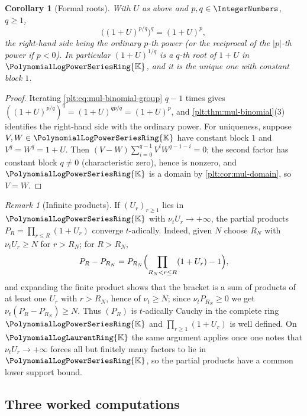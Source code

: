 \documentclass[11pt,oneside]{article}
\theoremstyle{plain}
\newtheorem{corollary}[theorem]{Corollary}
\theoremstyle{definition}
\theoremstyle{remark}
\newtheorem{remark}[theorem]{Remark}
\newcommand{\K}{\mathbb{K}}
\newcommand{\PLpow}{\PolynomialLogPowerSeriesRing{\K}}   %
\newcommand{\PLlau}{\PolynomialLogLaurentRing{\K}}       %
\newcommand{\ordt}{\nu_{t}}                              %
\begin{document}
\begin{corollary}[Formal roots]
\label{plt:cor:mul-roots}
With $U$ as above and $p,q\in\IntegerNumbers$, $q\ge1$,
\[
 \bigl((1+U)^{p/q}\bigr)^{q}=(1+U)^{p},
\]
the right-hand side being the ordinary $p$-th power (or the reciprocal of the
$|p|$-th power if $p<0$).  In particular $(1+U)^{1/q}$ is a $q$-th root of
$1+U$ in $\PLpow$, and it is the unique one with constant block $1$.
\end{corollary}

\begin{proof}
Iterating \eqref{plt:eq:mul-binomial-group} $q-1$ times gives
$((1+U)^{p/q})^q=(1+U)^{qp/q}=(1+U)^p$, and
\cref{plt:thm:mul-binomial}(3) identifies the right-hand side with the
ordinary power.  For uniqueness, suppose $V,W\in\PLpow$ have constant block
$1$ and $V^q=W^q=1+U$.  Then $(V-W)\sum_{i=0}^{q-1}V^iW^{q-1-i}=0$; the
second factor has constant block $q\ne0$ (characteristic zero), hence is
nonzero, and $\PLpow$ is a domain by \cref{plt:cor:mul-domain}, so $V=W$.
\end{proof}

\begin{remark}[Infinite products]
\label{plt:rmk:mul-infinite-products}
If $(U_r)_{r\ge1}$ lies in $\PLpow$ with $\ordt U_r\to+\infty$, the partial
products $P_R=\prod_{r\le R}(1+U_r)$ converge $t$-adically.  Indeed, given
$N$ choose $R_N$ with $\ordt U_r\ge N$ for $r>R_N$; for $R>R_N$,
\[
 P_R-P_{R_N}=P_{R_N}\Bigl(\prod_{R_N<r\le R}(1+U_r)-1\Bigr),
\]
and expanding the finite product shows that the bracket is a sum of products
of at least one $U_r$ with $r>R_N$, hence of $\ordt\ge N$; since
$\ordt P_{R_N}\ge0$ we get $\ordt(P_R-P_{R_N})\ge N$.  Thus $(P_R)$ is
$t$-adically Cauchy in the complete ring $\PLpow$ and
$\prod_{r\ge1}(1+U_r)$ is well defined.  On $\PLlau$ the same argument
applies once one notes that $\ordt U_r\to+\infty$ forces all but finitely
many factors to lie in $\PLpow$, so the partial products have a common lower
support bound.
\end{remark}

\subsection{Three worked computations}
\label{plt:sec:mul-worked}
\end{document}
